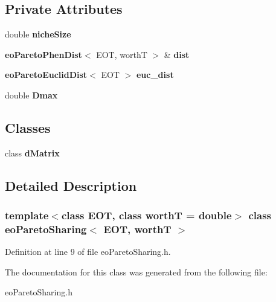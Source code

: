 \subsection*{Private Attributes}
\begin{CompactItemize}
\item 
double {\bf niche\-Size}\label{classeoParetoSharing_0da31e076cf2098639cd1a9fa06f3942}

\item 
{\bf eo\-Pareto\-Phen\-Dist}$<$ EOT, worth\-T $>$ \& {\bf dist}\label{classeoParetoSharing_f5cff5bf666314e59d58043531253b1b}

\item 
{\bf eo\-Pareto\-Euclid\-Dist}$<$ EOT $>$ {\bf euc\_\-dist}\label{classeoParetoSharing_9b8e6e2c76d816afb23dfdbf91dabf57}

\item 
double {\bf Dmax}\label{classeoParetoSharing_35449ebac125955c49a6d34db0e710b3}

\end{CompactItemize}
\subsection*{Classes}
\begin{CompactItemize}
\item 
class {\bf d\-Matrix}
\end{CompactItemize}


\subsection{Detailed Description}
\subsubsection*{template$<$class EOT, class worth\-T = double$>$ class eo\-Pareto\-Sharing$<$ EOT, worth\-T $>$}





Definition at line 9 of file eo\-Pareto\-Sharing.h.

The documentation for this class was generated from the following file:\begin{CompactItemize}
\item 
eo\-Pareto\-Sharing.h\end{CompactItemize}
